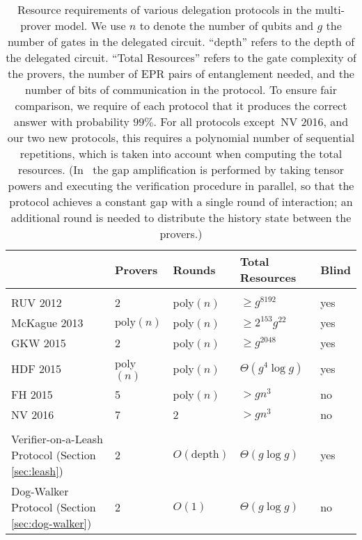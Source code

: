 \documentclass[11pt,letter]{article}
\theoremstyle{remark}
\theoremstyle{definition}
\begin{document}
\begin{table}[t]
\centering
\begin{tabular}{l|llll}
& Provers & Rounds & Total Resources & Blind\\
\hline\\[-8pt]
RUV 2012 \cite{reichardt2012classical}  &2 & poly$(n)$ & $\geq g^{8192}$ & yes\\[3pt]
McKague 2013 \cite{McKague16} &  $\mathrm{poly}(n)$ & poly$(n)$ & $\geq 2^{153}g^{22}$ & yes \\[3pt]
GKW 2015 \cite{Gheorghiu15} &  2 & poly$(n)$ & $\geq g^{2048}$ & yes \\[3pt]
HDF 2015 \cite{hajdusek2015} &  poly$(n)$& poly$(n)$ & $\Theta(g^4\log g)$ & yes \\[3pt]
FH 2015 \cite{hajdusek2015posthoc} & 5 & poly$(n)$ & $>gn^3$ & no\\[3pt]
NV 2016 \cite{natarajan2016robust} &  7 & 2 & $>gn^3$ & no\\[3pt]
\hline\\[-8pt]
Verifier-on-a-Leash Protocol (Section \ref{sec:leash})   & 2 & $O(\mbox{depth})$  & $\Theta(g\log g)$ & yes %
\\[3pt]
Dog-Walker Protocol (Section \ref{sec:dog-walker})  & 2 & $O(1)$ & $\Theta(g\log g)$ & no 
\end{tabular}
\caption{Resource requirements of various delegation protocols in the multi-prover model. 
We use $n$ to denote the number of qubits and $g$ the number of gates in the
  delegated circuit. ``depth'' refers to the depth of the delegated circuit. ``Total Resources'' refers to the gate complexity of the
  provers, the number of EPR pairs of entanglement needed, and the number of
  bits of communication in the protocol. To ensure fair comparison, we require
  of each protocol that it produces the correct answer with probability $99\%$. For all protocols except~NV 2016, and our two new protocols, this requires a polynomial number of sequential repetitions, which is taken into account when computing the total resources. (In~\cite{natarajan2016robust} the gap amplification is performed by taking tensor powers and executing the verification procedure in parallel, so that the protocol achieves a constant gap with a single round of interaction; an additional round is needed to distribute the history state between the provers.)}
\label{tab:comparison}
\end{table}
\end{document}
